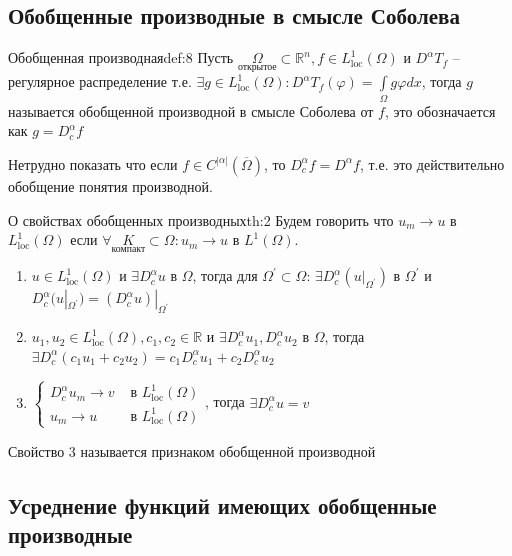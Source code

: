 \documentclass[12pt,a4paper]{article}
\newcommand{\intset}[1]{\int\limits_{#1}}
\newcommand{\Real}{\mathbb{R}}
\begin{document}
\subsection{Обобщенные производные в смысле Соболева}

\begin{definition}{Обобщенная производная}{def:8}
	Пусть $\underset{\text{открытое}}{\Omega} \subset \Real^n, f \in L_{\text{loc}}^1 (\Omega)$ и $D^\alpha T_f$ -- регулярное распределение т.е. $\exists g \in L_{\text{loc}}^1 (\Omega): D^\alpha T_f (\varphi) = \intset{\Omega}{g \varphi dx}$, тогда $g$ называется обобщенной производной в смысле Соболева от $f$, это обозначается как $g = D_c^\alpha f$
\end{definition}
Нетрудно показать что если $f \in C^{|\alpha|} (\overline{\Omega})$, то $D_c^\alpha f = D^\alpha f$, т.е. это действительно обобщение понятия производной.

\begin{theorem}{О свойствах обобщенных производных}{th:2}
	Будем говорить что $u_m \to u$ в $L_{\text{loc}}^1 (\Omega)$ если $\forall \underset{\text{компакт}}{K} \subset \Omega: u_m \to u \text{ в } L^1 (\Omega)$. 
	\begin{enumerate}
		\item $u \in L_{\text{loc}}^1 (\Omega)$ и $\exists D_c^\alpha u$ в $\Omega$, тогда для $\Omega^\prime \subset \Omega$: $\exists D_c^\alpha (u|_{\Omega^\prime}) \text{ в } \Omega^\prime$ и \\ $D_c^\alpha (u|_{\Omega^\prime}) = (D_c^\alpha u)|_{\Omega^\prime}$
		\item $u_1, u_2 \in L_{\text{loc}}^1 (\Omega), c_1, c_2 \in \Real$ и $\exists D_c^\alpha u_1, D_c^\alpha u_2$ в $\Omega$, тогда \\ $\exists D_c^\alpha (c_1 u_1 + c_2 u_2) = c_1 D_c^\alpha u_1 + c_2 D_c^\alpha u_2$
		\item $\begin{cases} 
				D_c^\alpha u_m \to v &\text{ в } L_{\text{loc}}^1 (\Omega) \\
				u_m \to u &\text{ в } L_{\text{loc}}^1 (\Omega) 
				\end{cases}$, тогда $\exists D_c^\alpha u = v$
	\end{enumerate}
	Свойство 3 называется признаком обобщенной производной
\end{theorem}

\subsection{Усреднение функций имеющих обобщенные производные}
\end{document}

